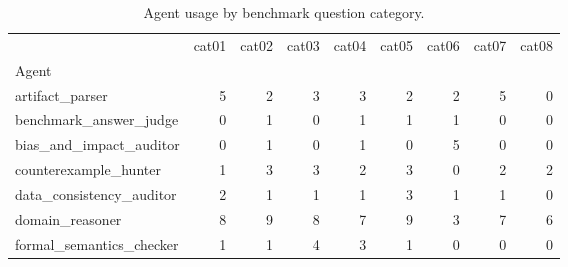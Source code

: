 \begin{table}
\caption{Agent usage by benchmark question category.}
\label{tab:agent-usage-by-category}
\begin{tabular}{lrrrrrrrr}
\toprule
 & cat01 & cat02 & cat03 & cat04 & cat05 & cat06 & cat07 & cat08 \\
Agent &  &  &  &  &  &  &  &  \\
\midrule
artifact\_parser & 5 & 2 & 3 & 3 & 2 & 2 & 5 & 0 \\
benchmark\_answer\_judge & 0 & 1 & 0 & 1 & 1 & 1 & 0 & 0 \\
bias\_and\_impact\_auditor & 0 & 1 & 0 & 1 & 0 & 5 & 0 & 0 \\
counterexample\_hunter & 1 & 3 & 3 & 2 & 3 & 0 & 2 & 2 \\
data\_consistency\_auditor & 2 & 1 & 1 & 1 & 3 & 1 & 1 & 0 \\
domain\_reasoner & 8 & 9 & 8 & 7 & 9 & 3 & 7 & 6 \\
formal\_semantics\_checker & 1 & 1 & 4 & 3 & 1 & 0 & 0 & 0 \\
\bottomrule
\end{tabular}
\end{table}

